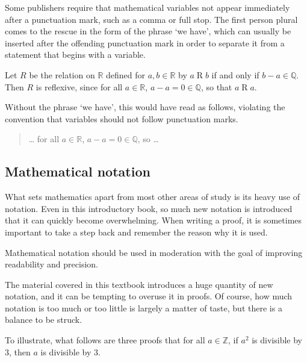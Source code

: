 Some publishers require that mathematical variables not appear immediately after a punctuation mark, such as a comma or full stop. The first person plural comes to the rescue in the form of the phrase `we have', which can usually be inserted after the offending punctuation mark in order to separate it from a statement that begins with a variable.

\begin{extract}
\label{xtrDifferenceOfRealsInQIsReflexive}
Let $R$ be the relation on $\mathbb{R}$ defined for $a,b \in \mathbb{R}$ by $a \mathrel{R} b$ if and only if $b-a \in \mathbb{Q}$. Then $R$ is reflexive, since for all $a \in \mathbb{R}$,  $a-a = 0 \in \mathbb{Q}$, so that $a \mathrel{R} a$.
\end{extract}

Without the phrase `we have', this would have read as follows, violating the convention that variables should not follow punctuation marks.
\begin{quote}
\dots{} for all $a \in \mathbb{R}$, $a-a = 0 \in \mathbb{Q}$, so \dots{}
\end{quote}

\subsection*{Mathematical notation}

What sets mathematics apart from most other areas of study is its heavy use of notation. Even in this introductory book, so much new notation is introduced that it can quickly become overwhelming. When writing a proof, it is sometimes important to take a step back and remember the reason why it is used.

\begin{writingprinciple}
\label{wpPurposeOfNotation}
Mathematical notation should be used in moderation with the goal of improving readability and precision.
\end{writingprinciple}

The material covered in this textbook introduces a huge quantity of new notation, and it can be tempting to overuse it in proofs. Of course, how much notation is too much or too little is largely a matter of taste, but there is a balance to be struck.

To illustrate, what follows are three proofs that for all $a \in \mathbb{Z}$, if $a^2$ is divisible by $3$, then $a$ is divisible by $3$.


